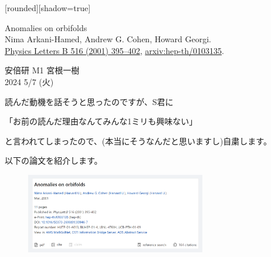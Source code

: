 \documentclass[
  unicode,a4paper,9pt,
  xcolor = {dvipsnames,svgnames},
  hyperref ={colorlinks=true,citecolor=Navy,linkcolor=NavyBlue,urlcolor=purple},
  ja=standard,lualatex
]{beamer}
\begin{document}
\nocite{Arkani-Hamed:2001uol}

\begin{frame}

  [rounded][shadow=true]
  \begin{block}{}
    \vspace*{5pt}

    \centering\Large
    Anomalies on orbifolds
    \\
    \normalsize
    Nima Arkani-Hamed, Andrew G. Cohen, Howard Georgi.
    \\
    \small
    \href{https://doi.org/10.1016/S0370-2693(01)00946-7}{Physics Letters B 516 (2001) 395–402},
    \href{https://doi.org/10.48550/arXiv.hep-th/0103135}{arxiv:hep-th/0103135}.

    \vspace*{5pt}
  \end{block}

  \begin{center}
    安倍研 M1 宮根一樹\\
    2024 5/7 (火)
  \end{center}

\end{frame}


\begin{frame}


  読んだ動機を話そうと思ったのですが、\pause S君に
  \begin{center}
    「お前の読んだ理由なんてみんな1ミリも興味ない」
  \end{center}
  と言われてしまったので、(本当にそうなんだと思いますし)自粛します。

  \vspace*{10pt}

  以下の論文を紹介します。
  \begin{figure}[ht]
    \centering
    \includegraphics[width=0.7\textwidth]{fig/Arkani-Hamed2001uol.png}
  \end{figure}

\end{frame}
\end{document}
